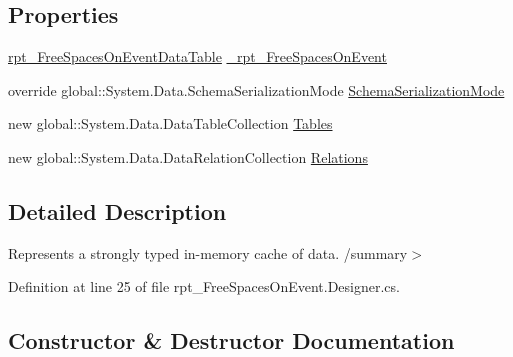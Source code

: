 \subsection*{Properties}
\begin{DoxyCompactItemize}
\item 
\hyperlink{classprj_progra_i_i_i_1_1rpt___free_spaces_on_event_1_1rpt___free_spaces_on_event_data_table}{rpt\+\_\+\+Free\+Spaces\+On\+Event\+Data\+Table} \hyperlink{classprj_progra_i_i_i_1_1rpt___free_spaces_on_event_aa03f5088806705e6254de84ae5ff0f0e}{\+\_\+rpt\+\_\+\+Free\+Spaces\+On\+Event}
\item 
override global\+::\+System.\+Data.\+Schema\+Serialization\+Mode \hyperlink{classprj_progra_i_i_i_1_1rpt___free_spaces_on_event_a3d4323b4061baa4b851f98a713453a9e}{Schema\+Serialization\+Mode}
\item 
new global\+::\+System.\+Data.\+Data\+Table\+Collection \hyperlink{classprj_progra_i_i_i_1_1rpt___free_spaces_on_event_a35d29320c2fd4376fb32314ec9c3d186}{Tables}
\item 
new global\+::\+System.\+Data.\+Data\+Relation\+Collection \hyperlink{classprj_progra_i_i_i_1_1rpt___free_spaces_on_event_a3ddc8e70e30d172babf1e9191a083786}{Relations}
\end{DoxyCompactItemize}


\subsection{Detailed Description}
Represents a strongly typed in-\/memory cache of data. /summary$>$ 

Definition at line 25 of file rpt\+\_\+\+Free\+Spaces\+On\+Event.\+Designer.\+cs.



\subsection{Constructor \& Destructor Documentation}
\hypertarget{classprj_progra_i_i_i_1_1rpt___free_spaces_on_event_a2ed39f657ec0a43ec5d53560eece1a43}{}\label{classprj_progra_i_i_i_1_1rpt___free_spaces_on_event_a2ed39f657ec0a43ec5d53560eece1a43} 
